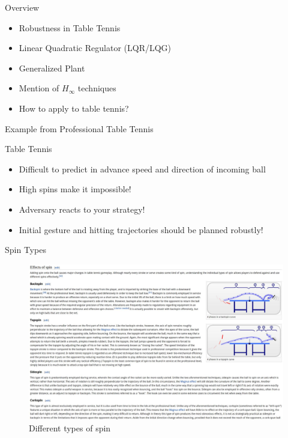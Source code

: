 \documentclass[handout]{beamer}
\begin{document}
%
\begin{frame}{Overview}
\begin{itemize}
\item Robustness in Table Tennis
\item Linear Quadratic Regulator (LQR/LQG)
\item Generalized Plant
\item Mention of $H_{\infty}$ techniques
\item How to apply to table tennis?
\end{itemize}
\end{frame}
%
\begin{frame}{Example from Professional Table Tennis}
\end{frame}
%
\begin{frame}{Table Tennis}
\begin{itemize}
\item Difficult to predict in advance speed and direction of incoming ball
\item High spins make it impossible!
\item Adversary reacts to your strategy!
\item Initial gesture and hitting trajectories should be planned robustly!
\end{itemize}
\end{frame}
%
\begin{frame}{Spin Types}
\begin{figure}
\center
\includegraphics[scale=0.4]{spinTypes.jpg}		
\caption{Different types of spin~\cite{wiki}}
\end{figure}
\end{frame}
\end{document}
